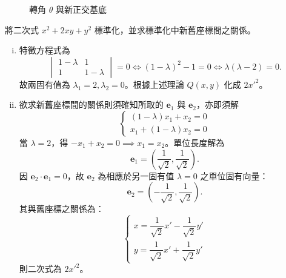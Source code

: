 \begin{figure}[htbp]
\centering
{}
\caption{轉角 $\theta$ 與新正交基底}
\label{fig:b4-ch4-fig3-1}
\end{figure}

\begin{discussion}
將二次式 $x^2 + 2xy + y^2$ 標準化，並求標準化中新舊座標間之關係。
\end{discussion}

\begin{solution}
\begin{enumerate}[(i)]
  \item 特徵方程式為
  \[
  \begin{vmatrix} 1 - \lambda & 1 \\ 1 & 1 - \lambda \end{vmatrix} = 0 \iff (1 - \lambda)^2 - 1 = 0 \iff \lambda(\lambda - 2) = 0.
  \]
  故兩固有值為 $\lambda_1 = 2, \lambda_2 = 0$。根據上述理論 $Q(x, y)$ 化成 $2{x'}^2$。
  
  \item 欲求新舊座標間的關係則須確知所取的 $\mathbf{e}_1$ 與 $\mathbf{e}_2$，亦即須解
  \[
  \begin{cases}
  (1 - \lambda)x_1 + x_2 = 0 \\
  x_1 + (1 - \lambda)x_2 = 0
  \end{cases}
  \]
  當 $\lambda = 2$，得 $-x_1 + x_2 = 0 \implies x_1 = x_2$。單位長度解為
  \[
  \mathbf{e}_1 = \left( \frac{1}{\sqrt{2}}, \frac{1}{\sqrt{2}} \right).
  \]
  因 $\mathbf{e}_2 \cdot \mathbf{e}_1 = 0$，故 $\mathbf{e}_2$ 為相應於另一固有值 $\lambda = 0$ 之單位固有向量：
  \[
  \mathbf{e}_2 = \left( -\frac{1}{\sqrt{2}}, \frac{1}{\sqrt{2}} \right).
  \]
  其與舊座標之關係為：
  \[
  \begin{cases}
  x = \dfrac{1}{\sqrt{2}}x' - \dfrac{1}{\sqrt{2}}y' \\[0.5em]
  y = \dfrac{1}{\sqrt{2}}x' + \dfrac{1}{\sqrt{2}}y'
  \end{cases}
  \]
  則二次式為 $2{x'}^2$。
\end{enumerate}
\end{solution}

